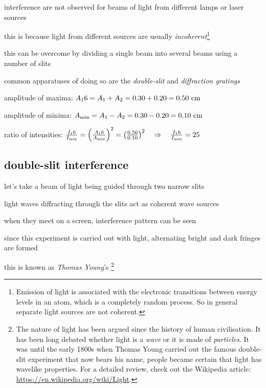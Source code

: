 \cmt interference are not observed for beams of light from different lamps or laser sources

this is because light from different sources are usually \emph{incoherent}\footnote{Emission of light is associated with the electronic transitions between energy levels in an atom, which is a completely random process. So in general separate light sources are not coherent.}

this can be overcome by dividing a single beam into several beams using a number of slits

common apparatuses of doing so are the \emph{double-slit} and \emph{diffraction gratings}


\begin{soln} amplitude of maxima: $A_16 = A_1 + A_2 = 0.30 + 0.20 = 0.50 \text{ cm}$

amplitude of minima: $A_{\text{min}} = A_1 - A_2 = 0.30 - 0.20 = 0.10 \text{ cm}$

ratio of intensities: $\frac{I_16}{I_{\text{min}}} = \left( \frac{A_16}{A_{\text{min}}} \right)^2 = \left( \frac{0.50}{0.10} \right)^2 \quad \Rightarrow \quad \frac{I_16}{I_{\text{min}}} = 25$ \end{soln}



\newpage


\subsection{double-slit interference}

let's take a beam of light being guided through two narrow slits

light waves diffracting through the slits act as coherent wave sources

when they meet on a screen, interference pattern can be seen

since this experiment is carried out with light, alternating bright and dark fringes are formed

this is known as \emph{Thomas Young}'s 
\footnote[][-4cm]{The nature of light has been argued since the history of human civilisation. It has been long debated whether light is a \emph{wave} or it is made of \emph{particles}. It was until the early 1800s when Thomas Young carried out the famous double-slit experiment that now bears his name, people became certain that light has wavelike properties. For a detailed review, check out the Wikipedia article: \url{https://en.wikipedia.org/wiki/Light}.}

